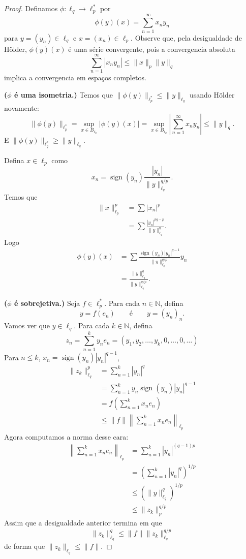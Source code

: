\documentclass[portuguese]{article}
\theoremstyle{definition}
\newcommand{\N}{\mathbb{N}}
\begin{document}
	\begin{proof}
		Definamos $\phi:\ell_q\to\ell_p^*$ por \[\phi(y)(x)=\sum_{n=1}^\infty x_ny_n\]
		para $y=(y_n)\in\ell_q$ e $x=(x_n)\in\ell_p$. Observe que, pela desigualdade de Hölder, $\phi(y)(x)$ é uma série convergente, pois a convergencia absoluta
		\[\sum_{n=1}^\infty |x_ny_n|\leq\| x\|_p\| y\|_q\]
		implica a convergencia em espaços completos.
		
		\textbf{($\phi$ é uma isometria.)} Temos que $\| \phi(y)\|_{\ell^*_p}\leq\| y\|_{\ell_q}$ usando Hölder novamente:
		\[\|\phi(y)\|_{\ell^*_p}=\sup_{x\in B_{\ell_p}}|\phi(y)(x)|=\sup_{x\in B_{\ell_p}}\left|\sum_{n=1}^\infty x_ny_n\right|\leq\| y\|_q.\]
		E $\|\phi(y)\|_{\ell^*_q}\geq\| y\|_{\ell_q}$.
		
		Defina $x\in\ell_p$ como
		\[x_n=\operatorname{sign}(y_n)\frac{|y_n|}{\| y\|_{\ell_q}^{q/p}}.\]
		Temos que
		\begin{align*}
			\| x\|_{\ell_p}^p&=\sum|x_n|^p\\
			&=\sum\frac{|y_n|^{pq-p}}{\| y\|^q_{\ell_q}}.
		\end{align*}
		Logo
		\begin{align*}
			\phi(y)(x)&=\sum\frac{\operatorname{sign}(y_n)|y_n|^{q-1}}{\| y\|^{q/p}_{\ell_q}}y_n\\
			&=\frac{\| y\|^q_{\ell_q}}{\| y\|_{\ell_q}^{q/p}}.
		\end{align*}
		
		\textbf{($\phi$ é sobrejetiva.)} Seja $f\in\ell_p^*$. Para cada $n\in\N$, defina 
		\[y=f(e_n)\qquad\text{é}\qquad y=(y_n)_n.\]
		Vamos ver que $y\in\ell_q$. Para cada $k\in\N$, defina
		\[z_n=\sum_{n=1}^ky_ne_n=(y_1,y_2,\ldots, y_k,0,\ldots,0,\ldots)\]
		Para $n\leq k$, $x_n=\operatorname{sign}(y_n)|y_n|^{q-1}$,				
		\begin{align*}
			\| z_k\|_{\ell_q}^p&=\sum_{n=1}^k|y_n|^q\\
			&=\sum_{n=1}^ky_n\operatorname{sign}(y_n)|y_n|^{q-1}\\
			&=f\left(\sum_{n=1}^kx_ne_n\right)\\
			&\leq \| f\| \left\|\sum_{n=1}^k x_ne_n\right\|_{\ell_p}
		\end{align*}
		Agora computamos a norma desse cara:
		\begin{align*}
			\left\|\sum_{n=1}^kx_ne_n\right\|_{\ell_p}&=\sum_{n=1}^k|y_n|^{(q-1)p}\\
			&=\left(\sum_{n=1}^k|y_n|^q\right)^{1/p}\\
			&\leq\left(\| y\|_{\ell_q}^q\right)^{1/p}\\
			&\leq\| z_k\|_p^{q/p}
		\end{align*}
		Assim que a desigualdade anterior termina em que
		\[\| z_k\|_{\ell_q}^q\leq\| f\|\| z_k\|_{\ell_q}^{q/p}\]
		de forma que $\| z_k\|_{\ell_q}\leq\| f\|$.
	\end{proof}
	
\end{document}
